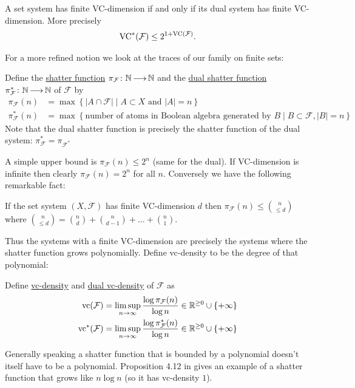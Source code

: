 \documentclass{amsart}
\newcommand{\F}{\mathcal F}
\newcommand{\curly}[1]{\left\{#1\right\}}
\newcommand{\defn}{\underline}
\begin{document}
\begin{Lemma}
  A set system has finite VC-dimension if and only if its dual system has finite VC-dimension.
  More precisely
  \begin{align*}
    \VC^*(\F) \leq 2^{1+\VC(\F)}.
  \end{align*}
\end{Lemma}

For a more refined notion we look at the traces of our family on finite sets:
\begin{Definition}
  Define the \defn{shatter function} $\pi_\F \colon \N \arr \N$ and the \defn{dual shatter function} $\pi^*_\F \colon \N \arr \N$ of $\F$ by 
  \begin{align*}
    \pi_\F(n) &= \max \curly{|A \cap \F| \mid A \subset X \text{ and } |A| = n} \\
    \pi^*_\F(n) &= \max \curly{\text{number of atoms in Boolean algebra generated by $B$} \mid B \subset \F, |B| = n}
  \end{align*}
  Note that the dual shatter function is precisely the shatter function of the dual system: $\pi^*_\F = \pi_{\F^*}$
\end{Definition}  

A simple upper bound is $\pi_\F(n) \leq 2^n$ (same for the dual).
If VC-dimension is infinite then clearly $\pi_\F(n) = 2^n$ for all $n$. Conversely we have the following remarkable fact:
\begin{Theorem} 
  If the set system $(X, \F)$ has finite VC-dimension $d$ then $\pi_\F(n) \leq {n \choose \leq d}$ where
  ${n \choose \leq d} = {n \choose d} + {n \choose d - 1} + \ldots + {n \choose 1}$.    
\end{Theorem}

Thus the systems with a finite VC-dimension are precisely the systems where the shatter function grows polynomially.
Define vc-density to be the degree of that polynomial:
\begin{Definition}
  Define \defn{vc-density} and \defn{dual vc-density} of $\F$ as
  \begin{align*}
    \vc(\F) &= \limsup_{n \to \infty}\frac{\log \pi_\F(n)}{\log n} \in \R^{\geq 0} \cup \curly{+\infty}\\
    \vc^*(\F) &= \limsup_{n \to \infty}\frac{\log \pi^*_\F(n)}{\log n}\in \R^{\geq 0} \cup \curly{+\infty}
  \end{align*}
\end{Definition}

Generally speaking a shatter function that is bounded by a polynomial doesn't itself have to be a polynomial.
Proposition 4.12 in \cite{density} gives an example of a shatter function that grows like $n \log n$ (so it has vc-density $1$).
\end{document}

